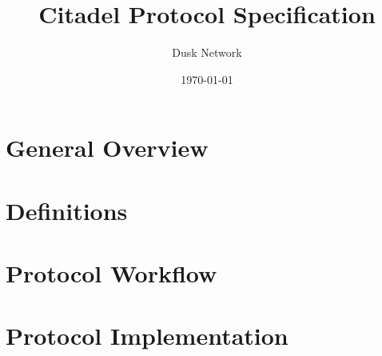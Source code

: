 \documentclass[10pt]{article}
\title{Citadel Protocol Specification}
\date{\today}
\author{Dusk Network}
\newcounter{protocol}
\begin{document}
\maketitle

\tableofcontents
\pagebreak 

\section{General Overview}
\label{sec:overview}


\section{Definitions}
\label{sec:definitions}


\section{Protocol Workflow}
\label{sec:protocol}


\section{Protocol Implementation}
\label{sec:implementation}

\end{document}
